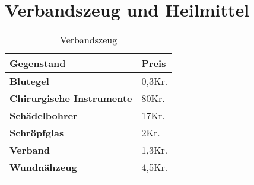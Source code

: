 \section{Verbandszeug und Heilmittel}
\begin{longtable}{|p{5cm}|p{2cm}|}
\hline
\textbf{Gegenstand} & \textbf{Preis} \\ \hline
\textbf{Blutegel} & 0,3Kr. \\ \hline
\textbf{Chirurgische Instrumente} & 80Kr. \\ \hline
\textbf{Schädelbohrer} & 17Kr. \\ \hline
\textbf{Schröpfglas} & 2Kr. \\ \hline
\textbf{Verband} & 1,3Kr. \\ \hline
\textbf{Wundnähzeug} & 4,5Kr. \\ \hline

\caption{Verbandszeug}
\label{tab:Verbandszeug}
\end{longtable}

